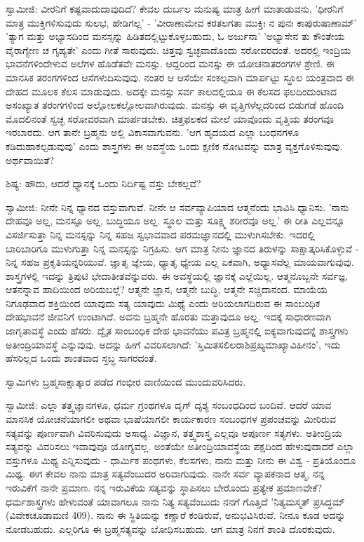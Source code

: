 ಸ್ವಾಮೀಜಿ: ವೀರನಿಗೆ ಕಷ್ಟವಾದುದಾವುದಿದೆ? ಕೇವಲ ದುರ್ಬಲ ಮನುಷ್ಯ ಮಾತ್ರ ಹೀಗೆ ಮಾತಾಡುವನು, 'ಧೀರನಿಗೆ ಮಾತ್ರ ಮುಕ್ತಿಗಳಿಸುವುದು ಸುಲಭ, ಹೇಡಿಗಲ್ಲ' - 'ವೀರಾಣಾಮೇವ ಕರತಲಗತಾ ಮುಕ್ತಿಃ ನ ಪುನಃ ಕಾಪುರುಷಾಣಾಮ್' 'ತ್ಯಾಗ ಮತ್ತು ಅಭ್ಯಾಸದಿಂದ ಮನಸ್ಸನ್ನು ಹಿಡಿತದಲ್ಲಿಟ್ಟುಕೊಳ್ಳಬಹುದು, ಓ ಅರ್ಜುನಾ' 'ಅಭ್ಯಾಸೇನ ತು ಕೌಂತೇಯ ವೈರಾಗ್ಯೇಣ ಚ ಗೃಹ್ಯತೇ' ಎಂದು ಗೀತೆ ಸಾರುವುದು. ಚಿತ್ತವು ಸ್ವಚ್ಛವಾದೊಂದು ಸರೋವರದಂತೆ. ಅದರಲ್ಲಿ ಇಂದ್ರಿಯ ಭಾವನೆಗಳಿಂದೇಳುವ ಅಲೆಗಳ ಹೊಡೆತವೇ ಮನಸ್ಸು. ಆದ್ದರಿಂದ ಮನಸ್ಸು ಈ ಯೋಚನಾತರಂಗಗಳ ಶ್ರೇಣಿ. ಈ ಮಾನಸಿಕ ತರಂಗಗಳಿಂದ ಆಸೆಗಳುದಿಸುವುವು. ನಂತರ ಆ ಆಸೆಯೇ ಸಂಕಲ್ಪವಾಗಿ ಮಾರ್ಪಟ್ಟು ಸ್ಥೂಲ ಯಂತ್ರವಾದ ಈ ದೇಹದ ಮೂಲಕ ಕೆಲಸ ಮಾಡುವುದು. ಅದಕ್ಕೇ ಮನಸ್ಸು ಸರ್ವ ಕಾಲದಲ್ಲಿಯೂ ಈ ಕೆಲಸದ ಫಲದಿಂದುಂಟಾದ ಅಸಂಖ್ಯಾತ ತರಂಗಗಳಿಂದ ಅಲ್ಲೋಲಕಲ್ಲೋಲವಾಗಿರುವುದು. ಮನಸ್ಸು ಈ ವೃತ್ತಿಗಳೆಲ್ಲದರಿಂದ ಬಿಡುಗಡೆ ಹೊಂದಿ ಮೊದಲಿನಂತೆ ಸ್ವಚ್ಛ ಸರೋವರವಾಗಿ ಮಾರ್ಪಡಬೇಕು. ಚಿತ್ತಫಲಕದ ಮೇಲೆ ಯಾವೊಂದು ವೃತ್ತಿಯ ತರಂಗವೂ ಇರಬಾರದು. ಆಗ ತಾನೇ ಬ್ರಹ್ಮನು ಅಲ್ಲಿ ವಿಕಾಸವಾಗುವನು. 'ಆಗ ಹೃದಯದ ಎಲ್ಲಾ ಬಂಧನಗಳೂ ಕಡಿದುಹಾಕಲ್ಪಡುವುವು' ಎಂದು ಶಾಸ್ತ್ರಗಳು ಈ ಅವಸ್ಥೆಯ ಒಂದು ಕ್ಷಣಿಕ ನೋಟವನ್ನು ಮಾತ್ರ ವ್ಯಕ್ತಗೊಳಿಸುವುವು. ಅರ್ಥವಾಯಿತೆ?

ಶಿಷ್ಯ: ಹೌದು, ಆದರೆ ಧ್ಯಾನಕ್ಕೆ ಒಂದು ನಿರ್ದಿಷ್ಟ ವಸ್ತು ಬೇಕಲ್ಲವೆ?

ಸ್ವಾಮೀಜಿ: ನೀನೇ ನಿನ್ನ ಧ್ಯಾನದ ವಸ್ತುವಾಗುವೆ. ನೀನೇ ಆ ಸರ್ವವ್ಯಾಪಿಯಾದ ಆತ್ಮನೆಂದು ಭಾವಿಸಿ ಧ್ಯಾನಿಸು. 'ನಾನು ದೇಹವೂ ಅಲ್ಲ, ಮನಸ್ಸೂ ಅಲ್ಲ, ಬುದ್ಧಿಯೂ ಅಲ್ಲ. ಸ್ಥೂಲ ಮತ್ತು ಸೂಕ್ಷ್ಮ ಶರೀರವೂ ಅಲ್ಲ.' ಈ ರೀತಿ ಎಲ್ಲವನ್ನೂ ವಿಸರ್ಜಿಸುತ್ತಾ ನಿನ್ನ ಮನಸ್ಸನ್ನು ನಿನ್ನ ಸಹಜ ಸ್ವಭಾವವಾದ ಪರಮಜ್ಞಾನದಲ್ಲಿ ಮುಳುಗಿಸಬೇಕು. ಇದರಲ್ಲಿ ಬಾರಿಬಾರಿಗೂ ಮುಳುಗುತ್ತಾ ನಿನ್ನ ಮನಸ್ಸನ್ನು ನಿಗ್ರಹಿಸು. ಆಗ ಮಾತ್ರ ನೀನು ಜ್ಞಾನದ ತಿರುಳನ್ನು ಸಾಕ್ಷಾತ್ಕರಿಸಿಕೊಳ್ಳುವೆ - ನಿನ್ನ ಸಹಜ ಪ್ರಕೃತಿಯನ್ನರಿಯುವೆ. ಜ್ಞಾತೃ ಜ್ಞೇಯ, ಧ್ಯಾತೃ ಧ್ಯೇಯ ಎಲ್ಲ ಏಕವಾಗಿ, ಅಧ್ಯಾಸವೆಲ್ಲ ಮಾಯವಾಗುವುವು. ಶಾಸ್ತ್ರಗಳಲ್ಲಿ ಇದನ್ನು ತ್ರಿಪುಟಿ ಭೇದಾತೀತವೆನ್ನುವರು. ಈ ಅವಸ್ಥೆಯಲ್ಲಿ ಜ್ಞಾನಕ್ಕೆ ಎಲ್ಲೆಯಿಲ್ಲ. ಆತ್ಮನೊಬ್ಬನೇ ಸರ್ವಜ್ಞ, ಆತನನ್ನಾವ ಹಾದಿಯಿಂದ ಅರಿಯಬಲ್ಲೆ? ಆತ್ಮನೇ ಜ್ಞಾನ, ಆತ್ಮನೇ ಬುದ್ಧಿ, ಆತ್ಮನೇ ಸಚ್ಚಿದಾನಂದ. ಮಾಯೆಯ ನಿಗೂಢವಾದ ಶಕ್ತಿಯಿಂದ ಯಾವುದು ಸತ್ಯ ಯಾವುದು ಮಿಥ್ಯೆ ಎಂದು ಅರಿಯಲಾಗದಿರುವ ಈ ಸಾಂಬಂಧಿಕ ದೇಹಭಾವನೆ ಜೀವನಿಗೆ ಉಂಟಾಗಿದೆ. ಅವನು ಬ್ರಹ್ಮನೇ ಹೊರತು ಮತ್ತಾವುದೂ ಅಲ್ಲ. ಇದಕ್ಕೆ ಸಾಧಾರಣವಾಗಿ ಜಾಗೃತಾವಸ್ಥೆ ಎಂದು ಹೆಸರು. ದ್ವೈತ ಸಾಂಬಂಧಿಕ ದೇಹ ಭಾವನೆಯು ಪವಿತ್ರ ಬ್ರಹ್ಮನಲ್ಲಿ ಐಕ್ಯವಾಗುವುದನ್ನೆ ಶಾಸ್ತ್ರಗಳು ಅತೀಂದ್ರಿಯಾವಸ್ಥೆ ಎನ್ನುವುವು. ಅದನ್ನು ಹೀಗೆ ವಿವರಿಸಲಾಗಿದೆ: 'ಸ್ತಿಮಿತಸಲಿಲರಾಶಿಪ್ರಖ್ಯಮಾಖ್ಯಾವಿಹೀನಂ', ಇದು ಹೆಸರಿಲ್ಲದ ಒಂದು ಶಾಂತವಾದ ಸ್ತಬ್ಧ ಸಾಗರದಂತೆ.

ಸ್ವಾಮಿಗಳು ಬ್ರಹ್ಮಸಾಕ್ಷಾತ್ಕಾರ ಪಡೆದ ಗಂಭೀರ ವಾಣಿಯಿಂದ ಮುಂದುವರಿಸಿದರು.

ಸ್ವಾಮೀಜಿ: ಎಲ್ಲಾ ತತ್ತ್ವಜ್ಞಾನಗಳೂ, ಧರ್ಮ ಗ್ರಂಥಗಳೂ ದೃಗ್ ದೃಶ್ಯ ಸಂಬಂಧದಿಂದ ಬಂದಿವೆ. ಆದರೆ ಯಾವ ಮಾನಸಿಕ ಯೋಚನೆಯಾಗಲೀ ಅಥವಾ ಭಾಷೆಯಾಗಲೀ ಕಾರ್ಯಕಾರಣ ಸಂಬಂಧಗಳ ಪ್ರಪಂಚವನ್ನು ಮೀರಿರುವ ಸತ್ಯವನ್ನು ಪೂರ್ಣವಾಗಿ ವಿವರಿಸುವುದು ಅಸಾಧ್ಯ. ವಿಜ್ಞಾನ, ತತ್ತ್ವಶಾಸ್ತ್ರ ಎಲ್ಲವೂ ಅಪೂರ್ಣ ಸತ್ಯಗಳು. ಅತೀಂದ್ರಿಯ ಸತ್ಯವನ್ನು ವಿವರಿಸಲು ಇವಾವುವೂ ಯೋಗ್ಯವಲ್ಲ. ಅಂತೆಯೇ ಅತೀಂದ್ರಿಯಾವಸ್ಥೆಯ ಪಕ್ಷದಿಂದ ಹೇಳುವುದಾದರೆ ಎಲ್ಲಾ ವಸ್ತುಗಳೂ ಮಿಥ್ಯ ಎನ್ನಿಸುವುದು - ಧಾರ್ಮಿಕ ಪಂಥಗಳು, ಕೆಲಸಗಳು, ನಾನು ಮತ್ತು ನೀನು ಈ ವಿಶ್ವ - ಪ್ರತಿಯೊಂದೂ ಮಿಥ್ಯ. ಈಗ ಕೇವಲ ನಾನು ಮಾತ್ರ ಸತ್ಯವೆಂಬುದರ ಅರಿವಾಗುವುದು. ನಾನೇ ಸರ್ವ ವ್ಯಾಪಕನಾದ ಆತ್ಮ, ನನ್ನ ಇರುವಿಕೆಗೆ ನಾನೇ ಪ್ರಮಾಣ. ನನ್ನ ಇರುವಿಕೆಯ ಸತ್ಯವನ್ನು ಸ್ಥಾಪಿಸಲು ಬೇರೊಂದು ಪ್ರತ್ಯೇಕ ಪ್ರಮಾಣವೇಕೆ? ಧರ್ಮಶಾಸ್ತ್ರಗಳು ಹೇಳುವಂತೆ ಯಾವಾಗಲೂ ನಾನು ನಿತ್ಯ ಸತ್ಯವೆಂಬುದು ನನಗೆ ಗೊತ್ತಿದೆ 'ನಿತ್ಯಮಸ್ಮತ್ ಪ್ರಸಿದ್ಧಮ್ (ವಿವೇಕಚೂಡಾಮಣಿ 409). ನಾನು ಈ ಸ್ಥಿತಿಯನ್ನು ಕಣ್ಣಾರೆ ಕಂಡಿರುವೆ, ಅನುಭವಿಸಿರುವೆ. ನೀನೂ ಕೂಡ ಅದನ್ನು ನೋಡಬಹುದು. ಎಲ್ಲರಿಗೂ ಈ ಬ್ರಹ್ಮಸತ್ಯವನ್ನು ಬೋಧಿಸಬಹುದು. ಆಗ ಮಾತ್ರ ನಿನಗೆ ಶಾಂತಿ ದೊರಕುವುದು.

